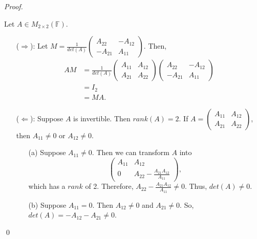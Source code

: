 \documentclass[12pt]{article}
\newenvironment{sol}
    {\emph{Proof.}
    }
    {
    \qed
    }
\begin{document}
\begin{sol}
Let $A \in M_{2 \times 2}(\mathbb{F})$.
\begin{itemize}
    \item[($\Longrightarrow$):] Let $M = \frac{1}{det(A)}\begin{pmatrix}
    A_{22} & -A_{12} \\ -A_{21} & A_{11}
    \end{pmatrix}$. Then, \begin{align*}
        AM &= \frac{1}{det(A)}\begin{pmatrix}
        A_{11} & A_{12} \\ A_{21} & A_{22}
        \end{pmatrix}\begin{pmatrix}
    A_{22} & -A_{12} \\ -A_{21} & A_{11}
    \end{pmatrix} \\
    &= I_2 \\
    &= MA.
    \end{align*} 
    
    \item[($\Longleftarrow$):] Suppose $A$ is invertible. Then $rank(A) = 2$. If $A = \begin{pmatrix}
        A_{11} & A_{12} \\ A_{21} & A_{22}
        \end{pmatrix}$, then $A_{11} \neq 0$ or $A_{12} \neq 0$.
        \begin{itemize}
            \item[(a)] Suppose $A_{11} \neq 0$. Then we can transform $A$ into $$\begin{pmatrix}
            A_{11} & A_{12} \\ 0 & A_{22}-\frac{A_{21}A_{12}}{A_{11}}
            \end{pmatrix},$$ which has a $rank$ of 2. Therefore, $A_{22}-\frac{A_{21}A_{12}}{A_{11}} \neq 0$. Thus, $det(A) \neq 0$. 
            
            \item[(b)] Suppose $A_{11} = 0$. Then $A_{12} \neq 0$ and $A_{21} \neq 0$. So, $det(A) = -A_{12}-A_{21} \neq 0$. 
        \end{itemize}
\end{itemize}
\end{sol}
\end{document}

